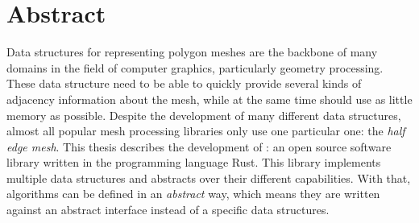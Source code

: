 \chapter*{\hfill Abstract}

Data structures for representing polygon meshes are the backbone of many domains in the field of computer graphics, particularly geometry processing. These data structure need to be able to quickly provide several kinds of adjacency information about the mesh, while at the same time should use as little memory as possible. Despite the development of many different data structures, almost all popular mesh processing libraries only use one particular one: the \emph{half edge mesh}. This thesis describes the development of : an open source software library written in the programming language Rust. This library implements multiple data structures and abstracts over their different capabilities. With that, algorithms can be defined in an \emph{abstract} way, which means they are written against an abstract interface instead of a specific data structures.

%
